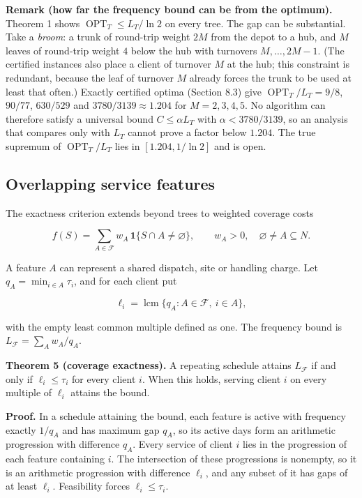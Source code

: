 \documentclass[
  british,
  11pt,
  a4paper,
]{article}
\newcounter{none} %
\begin{document}
\textbf{Remark (how far the frequency bound can be from the optimum).}
Theorem 1 shows \(\operatorname{OPT}_T\le L_T/\ln2\) on every tree. The
gap can be substantial. Take a \emph{broom}: a trunk of round-trip
weight \(2M\) from the depot to a hub, and \(M\) leaves of round-trip
weight \(4\) below the hub with turnovers \(M,\ldots,2M-1\). (The
certified instances also place a client of turnover \(M\) at the hub;
this constraint is redundant, because the leaf of turnover \(M\) already
forces the trunk to be used at least that often.) Exactly certified
optima (Section 8.3) give \(\operatorname{OPT}_T/L_T=9/8\), \(90/77\),
\(630/529\) and \(3780/3139\approx1.204\) for \(M=2,3,4,5\). No
algorithm can therefore satisfy a universal bound \(C\le\alpha L_T\)
with \(\alpha<3780/3139\), so an analysis that compares only with
\(L_T\) cannot prove a factor below \(1.204\). The true supremum of
\(\operatorname{OPT}_T/L_T\) lies in \([1.204,1/\ln2]\) and is open.

\subsection{Overlapping service
features}\label{overlapping-service-features}

The exactness criterion extends beyond trees to weighted coverage costs

\[
f(S)=\sum_{A\in\mathcal F}w_A\,\mathbf1\{S\cap A\ne\varnothing\},
\qquad w_A>0,\quad \varnothing\ne A\subseteq N.
\]

A feature \(A\) can represent a shared dispatch, site or handling
charge. Let \(q_A=\min_{i\in A}\tau_i\), and for each client put

\[
\ell_i=\operatorname{lcm}\{q_A:A\in\mathcal F,\ i\in A\},
\]

with the empty least common multiple defined as one. The frequency bound
is \(L_{\mathcal F}=\sum_A w_A/q_A\).

\textbf{Theorem 5 (coverage exactness).} A repeating schedule attains
\(L_{\mathcal F}\) if and only if \(\ell_i\le\tau_i\) for every client
\(i\). When this holds, serving client \(i\) on every multiple of
\(\ell_i\) attains the bound.

\textbf{Proof.} In a schedule attaining the bound, each feature is
active with frequency exactly \(1/q_A\) and has maximum gap \(q_A\), so
its active days form an arithmetic progression with difference \(q_A\).
Every service of client \(i\) lies in the progression of each feature
containing \(i\). The intersection of these progressions is nonempty, so
it is an arithmetic progression with difference \(\ell_i\), and any
subset of it has gaps of at least \(\ell_i\). Feasibility forces
\(\ell_i\le\tau_i\).
\end{document}
